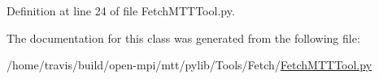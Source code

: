 Definition at line 24 of file Fetch\-M\-T\-T\-Tool.\-py.



The documentation for this class was generated from the following file\-:\begin{DoxyCompactItemize}
\item 
/home/travis/build/open-\/mpi/mtt/pylib/\-Tools/\-Fetch/\hyperlink{_fetch_m_t_t_tool_8py}{Fetch\-M\-T\-T\-Tool.\-py}\end{DoxyCompactItemize}
